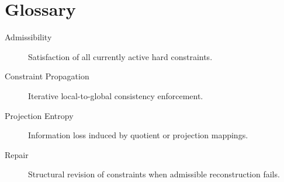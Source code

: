 \chapter*{Glossary}

\begin{description}
  \item[Admissibility] Satisfaction of all currently active hard constraints.
  \item[Constraint Propagation] Iterative local-to-global consistency enforcement.
  \item[Projection Entropy] Information loss induced by quotient or projection mappings.
  \item[Repair] Structural revision of constraints when admissible reconstruction fails.
\end{description}
